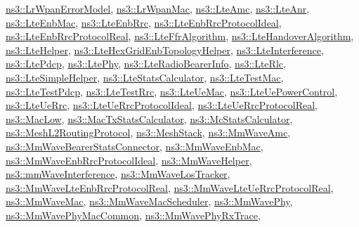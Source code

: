\hyperlink{classns3_1_1LrWpanErrorModel}{ns3\+::\+Lr\+Wpan\+Error\+Model}, \hyperlink{classns3_1_1LrWpanMac}{ns3\+::\+Lr\+Wpan\+Mac}, \hyperlink{classns3_1_1LteAmc}{ns3\+::\+Lte\+Amc}, \hyperlink{classns3_1_1LteAnr}{ns3\+::\+Lte\+Anr}, \hyperlink{classns3_1_1LteEnbMac}{ns3\+::\+Lte\+Enb\+Mac}, \hyperlink{classns3_1_1LteEnbRrc}{ns3\+::\+Lte\+Enb\+Rrc}, \hyperlink{classns3_1_1LteEnbRrcProtocolIdeal}{ns3\+::\+Lte\+Enb\+Rrc\+Protocol\+Ideal}, \hyperlink{classns3_1_1LteEnbRrcProtocolReal}{ns3\+::\+Lte\+Enb\+Rrc\+Protocol\+Real}, \hyperlink{classns3_1_1LteFfrAlgorithm}{ns3\+::\+Lte\+Ffr\+Algorithm}, \hyperlink{classns3_1_1LteHandoverAlgorithm}{ns3\+::\+Lte\+Handover\+Algorithm}, \hyperlink{classns3_1_1LteHelper}{ns3\+::\+Lte\+Helper}, \hyperlink{classns3_1_1LteHexGridEnbTopologyHelper}{ns3\+::\+Lte\+Hex\+Grid\+Enb\+Topology\+Helper}, \hyperlink{classns3_1_1LteInterference}{ns3\+::\+Lte\+Interference}, \hyperlink{classns3_1_1LtePdcp}{ns3\+::\+Lte\+Pdcp}, \hyperlink{classns3_1_1LtePhy}{ns3\+::\+Lte\+Phy}, \hyperlink{classns3_1_1LteRadioBearerInfo}{ns3\+::\+Lte\+Radio\+Bearer\+Info}, \hyperlink{classns3_1_1LteRlc}{ns3\+::\+Lte\+Rlc}, \hyperlink{classns3_1_1LteSimpleHelper}{ns3\+::\+Lte\+Simple\+Helper}, \hyperlink{classns3_1_1LteStatsCalculator}{ns3\+::\+Lte\+Stats\+Calculator}, \hyperlink{classns3_1_1LteTestMac}{ns3\+::\+Lte\+Test\+Mac}, \hyperlink{classns3_1_1LteTestPdcp}{ns3\+::\+Lte\+Test\+Pdcp}, \hyperlink{classns3_1_1LteTestRrc}{ns3\+::\+Lte\+Test\+Rrc}, \hyperlink{classns3_1_1LteUeMac}{ns3\+::\+Lte\+Ue\+Mac}, \hyperlink{classns3_1_1LteUePowerControl}{ns3\+::\+Lte\+Ue\+Power\+Control}, \hyperlink{classns3_1_1LteUeRrc}{ns3\+::\+Lte\+Ue\+Rrc}, \hyperlink{classns3_1_1LteUeRrcProtocolIdeal}{ns3\+::\+Lte\+Ue\+Rrc\+Protocol\+Ideal}, \hyperlink{classns3_1_1LteUeRrcProtocolReal}{ns3\+::\+Lte\+Ue\+Rrc\+Protocol\+Real}, \hyperlink{classns3_1_1MacLow}{ns3\+::\+Mac\+Low}, \hyperlink{classns3_1_1MacTxStatsCalculator}{ns3\+::\+Mac\+Tx\+Stats\+Calculator}, \hyperlink{classns3_1_1McStatsCalculator}{ns3\+::\+Mc\+Stats\+Calculator}, \hyperlink{classns3_1_1MeshL2RoutingProtocol}{ns3\+::\+Mesh\+L2\+Routing\+Protocol}, \hyperlink{classns3_1_1MeshStack}{ns3\+::\+Mesh\+Stack}, \hyperlink{classns3_1_1MmWaveAmc}{ns3\+::\+Mm\+Wave\+Amc}, \hyperlink{classns3_1_1MmWaveBearerStatsConnector}{ns3\+::\+Mm\+Wave\+Bearer\+Stats\+Connector}, \hyperlink{classns3_1_1MmWaveEnbMac}{ns3\+::\+Mm\+Wave\+Enb\+Mac}, \hyperlink{classns3_1_1MmWaveEnbRrcProtocolIdeal}{ns3\+::\+Mm\+Wave\+Enb\+Rrc\+Protocol\+Ideal}, \hyperlink{classns3_1_1MmWaveHelper}{ns3\+::\+Mm\+Wave\+Helper}, \hyperlink{classns3_1_1mmWaveInterference}{ns3\+::mm\+Wave\+Interference}, \hyperlink{classns3_1_1MmWaveLosTracker}{ns3\+::\+Mm\+Wave\+Los\+Tracker}, \hyperlink{classns3_1_1MmWaveLteEnbRrcProtocolReal}{ns3\+::\+Mm\+Wave\+Lte\+Enb\+Rrc\+Protocol\+Real}, \hyperlink{classns3_1_1MmWaveLteUeRrcProtocolReal}{ns3\+::\+Mm\+Wave\+Lte\+Ue\+Rrc\+Protocol\+Real}, \hyperlink{classns3_1_1MmWaveMac}{ns3\+::\+Mm\+Wave\+Mac}, \hyperlink{classns3_1_1MmWaveMacScheduler}{ns3\+::\+Mm\+Wave\+Mac\+Scheduler}, \hyperlink{classns3_1_1MmWavePhy}{ns3\+::\+Mm\+Wave\+Phy}, \hyperlink{classns3_1_1MmWavePhyMacCommon}{ns3\+::\+Mm\+Wave\+Phy\+Mac\+Common}, \hyperlink{classns3_1_1MmWavePhyRxTrace}{ns3\+::\+Mm\+Wave\+Phy\+Rx\+Trace}, 
